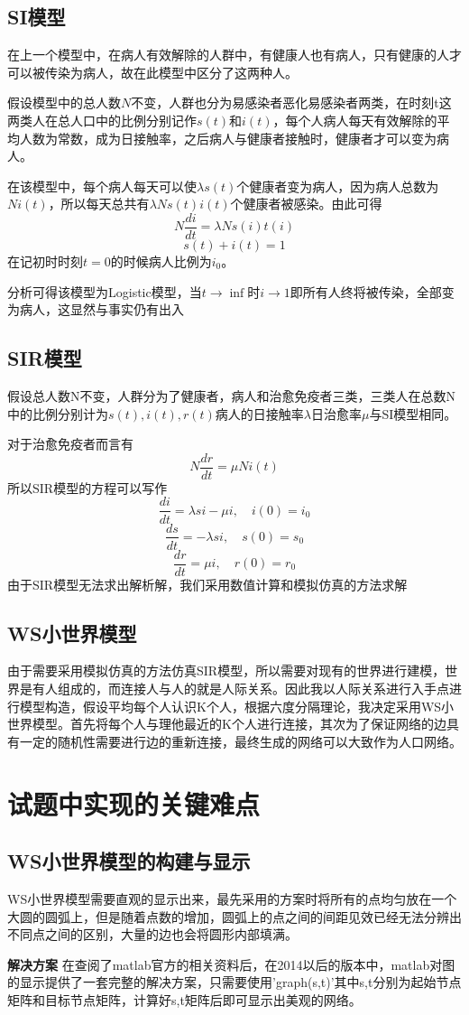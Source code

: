 \documentclass[supercite]{HustGraduPaper}
\begin{document}
	\subsection{SI模型}
	在上一个模型中，在病人有效解除的人群中，有健康人也有病人，只有健康的人才可以被传染为病人，故在此模型中区分了这两种人。
	\par
	假设模型中的总人数$N$不变，人群也分为易感染者恶化易感染者两类，在时刻t这两类人在总人口中的比例分别记作$s(t)和i(t)$，每个人病人每天有效解除的平均人数为常数，成为日接触率，之后病人与健康者接触时，健康者才可以变为病人。
	\par
	在该模型中，每个病人每天可以使$\lambda s(t)$个健康者变为病人，因为病人总数为$Ni(t)$，所以每天总共有$\lambda Ns(t)i(t)$个健康者被感染。由此可得
	$$N\frac{di}{dt} = \lambda Ns(i)t(i)$$
	$$s(t)+i(t) = 1$$
	在记初时时刻$t=0$的时候病人比例为$i_0$。\par
	分析可得该模型为Logistic模型，当$t \to \inf$时$i \to 1$即所有人终将被传染，全部变为病人，这显然与事实仍有出入
	
	\subsection{SIR模型}
	假设总人数N不变，人群分为了健康者，病人和治愈免疫者三类，三类人在总数N中的比例分别计为$s(t),i(t),r(t)$病人的日接触率$\lambda$日治愈率$\mu$与SI模型相同。\par
	对于治愈免疫者而言有
	$$N\frac{dr}{dt}=\mu N i(t)$$
	所以SIR模型的方程可以写作
	$$\frac{di}{dt}=\lambda si-\mu i, \quad i(0)=i_0$$
	$$\frac{ds}{dt}=-\lambda si, \quad s(0)=s_0$$
	$$\frac{dr}{dt}=\mu i, \quad r(0)=r_0$$
	由于SIR模型无法求出解析解，我们采用数值计算和模拟仿真的方法求解

	\subsection{WS小世界模型}
	由于需要采用模拟仿真的方法仿真SIR模型，所以需要对现有的世界进行建模，世界是有人组成的，而连接人与人的就是人际关系。因此我以人际关系进行入手点进行模型构造，假设平均每个人认识K个人，根据六度分隔理论，我决定采用WS小世界模型。首先将每个人与理他最近的K个人进行连接，其次为了保证网络的边具有一定的随机性需要进行边的重新连接，最终生成的网络可以大致作为人口网络。
	
	\section{试题中实现的关键难点}

	\subsection{WS小世界模型的构建与显示}
	WS小世界模型需要直观的显示出来，最先采用的方案时将所有的点均匀放在一个大圆的圆弧上，但是随着点数的增加，圆弧上的点之间的间距见效已经无法分辨出不同点之间的区别，大量的边也会将圆形内部填满。
	\par
	\textbf{解决方案}
	在查阅了matlab官方的相关资料后，在2014以后的版本中，matlab对图的显示提供了一套完整的解决方案，只需要使用'graph(s,t)'其中s,t分别为起始节点矩阵和目标节点矩阵，计算好s,t矩阵后即可显示出美观的网络。
	
\end{document}
